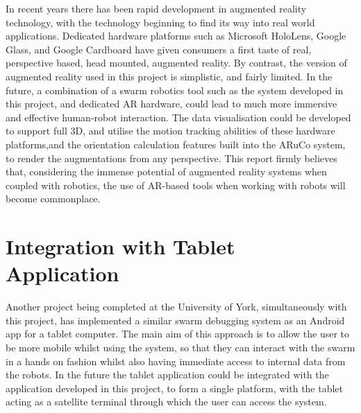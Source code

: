 In recent years there has been rapid development in augmented reality technology, with the technology beginning to find its way into real world applications. Dedicated hardware platforms such as Microsoft HoloLens, Google Glass, and Google Cardboard have given consumers a first taste of real, perspective based, head mounted, augmented reality. By contrast, the version of augmented reality used in this project is simplistic, and fairly limited. In the future, a combination of a swarm robotics tool such as the system developed in this project, and dedicated AR hardware, could lead to much more immersive and effective human-robot interaction. The data visualisation could be developed to support full 3D, and utilise the motion tracking abilities of these hardware platforms,and the orientation calculation features built into the ARuCo system, to render the augmentations from any perspective. This report firmly believes that, considering the immense potential of augmented reality systems when coupled with robotics, the use of AR-based tools when working with robots will become commonplace.


\section{Integration with Tablet Application}

Another project being completed at the University of York, simultaneously with this project, has implemented a similar swarm debugging system as an Android app for a tablet computer. The main aim of this approach is to allow the user to be more mobile whilst using the system, so that they can interact with the swarm in a hands on fashion whilst also having immediate access to internal data from the robots. In the future the tablet application could be integrated with the application developed in this project, to form a single platform, with the tablet acting as a satellite terminal through which the user can access the system.

